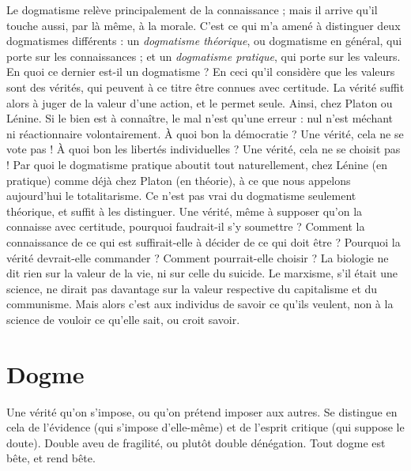 Le dogmatisme relève principalement de la connaissance ; mais il arrive
qu'il touche aussi, par là même, à la morale. C’est ce qui m’a amené à distinguer
deux dogmatismes différents : un {\it dogmatisme théorique}, ou dogmatisme
en général, qui porte sur les connaissances ; et un {\it dogmatisme pratique}, qui
porte sur les valeurs. En quoi ce dernier est-il un dogmatisme ? En ceci qu’il
considère que les valeurs sont des vérités, qui peuvent à ce titre être connues
avec certitude. La vérité suffit alors à juger de la valeur d’une action, et le
permet seule. Ainsi, chez Platon ou Lénine. Si le bien est à connaître, le mal
n’est qu’une erreur : nul n’est méchant ni réactionnaire volontairement. À quoi
bon la démocratie ? Une vérité, cela ne se vote pas ! À quoi bon les libertés
individuelles ? Une vérité, cela ne se choisit pas ! Par quoi le dogmatisme pratique
aboutit tout naturellement, chez Lénine (en pratique) comme déjà chez
Platon (en théorie), à ce que nous appelons aujourd’hui le totalitarisme. Ce
n'est pas vrai du dogmatisme seulement théorique, et suffit à les distinguer.
Une vérité, même à supposer qu’on la connaisse avec certitude, pourquoi faudrait-il
s’y soumettre ? Comment la connaissance de ce qui est suffirait-elle à
décider de ce qui doit être ? Pourquoi la vérité devrait-elle commander ? Comment
pourrait-elle choisir ? La biologie ne dit rien sur la valeur de la vie, ni sur
celle du suicide. Le marxisme, s’il était une science, ne dirait pas davantage sur
la valeur respective du capitalisme et du communisme. Mais alors c’est aux
individus de savoir ce qu’ils veulent, non à la science de vouloir ce qu’elle sait,
ou croit savoir.

\section{Dogme}
Une vérité qu’on s’impose, ou qu’on prétend imposer aux autres.
Se distingue en cela de l’évidence (qui s'impose d’elle-même) et de
l'esprit critique (qui suppose le doute). Double aveu de fragilité, ou plutôt
double dénégation. Tout dogme est bête, et rend bête.

